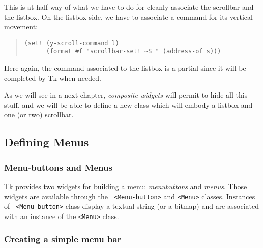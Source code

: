 This is at  half way of what we have to do for cleanly associate the scrollbar
and the listbox. On the listbox side, we have to associate a command for its 
vertical movement:
\begin{quote}
\begin{verbatim}
(set! (y-scroll-command l) 
      (format #f "scrollbar-set! ~S " (address-of s)))
\end{verbatim}
\end{quote}
Here again, the command associated to the listbox is a partial since it will
be completed by Tk when needed.

As we will see in a next chapter, {\em composite widgets} will permit
to hide all this stuff, and we will be able to define a new class
which will embody a listbox and one (or two) scrollbar.

\subsection{Defining Menus}

\subsubsection{Menu-buttons and Menus}
Tk provides two widgets for building a menu: {\em menubuttons} and
{\em menus}. Those widgets are available through the {\tt
<Menu-button>} and {\tt <Menu>} classes. Instances of {\tt
<Menu-button>} class display a textual string (or a bitmap) and are
associated with an instance of the {\tt <Menu>} class.

\subsubsection{Creating a simple menu bar}

